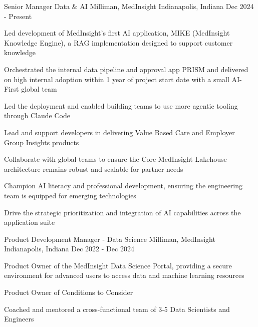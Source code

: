 

\begin{cventries}

  \cventry
    {Senior Manager Data \& AI} %
    {Milliman, MedInsight} %
    {Indianapolis, Indiana} %
    {Dec 2024 - Present} %
    {
      \begin{cvitems} %
        \item {Led development of MedInsight's first AI application, MIKE (MedInsight Knowledge Engine), a RAG implementation designed to support customer knowledge}
        \item {Orchestrated the internal data pipeline and approval app PRISM and delivered on high internal adoption within 1 year of project start date with a small AI-First global team}
        \item {Led the deployment and enabled building teams to use more agentic tooling through Claude Code}
        \item {Lead and support developers in delivering Value Based Care and Employer Group Insights products}
        \item {Collaborate with global teams to ensure the Core MedInsight Lakehouse architecture remains robust and scalable for partner needs}
        \item {Champion AI literacy and professional development, ensuring the engineering team is equipped for emerging technologies}
        \item {Drive the strategic prioritization and integration of AI capabilities across the application suite}
      \end{cvitems}
    }

  \cventry
    {Product Development Manager - Data Science} %
    {Milliman, MedInsight} %
    {Indianapolis, Indiana} %
    {Dec 2022 - Dec 2024} %
    {
      \begin{cvitems} %
        \item {Product Owner of the MedInsight Data Science Portal, providing a secure environment for advanced users to access data and machine learning resources}
        \item {Product Owner of Conditions to Consider}
        \item {Coached and mentored a cross-functional team of 3-5 Data Scientists and Engineers}
      \end{cvitems}
    }


\end{cventries}
